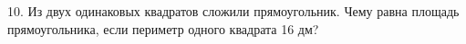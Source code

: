 10. Из двух одинаковых квадратов сложили прямоугольник. Чему равна площадь прямоугольника, если периметр одного квадрата 16 дм?\\
